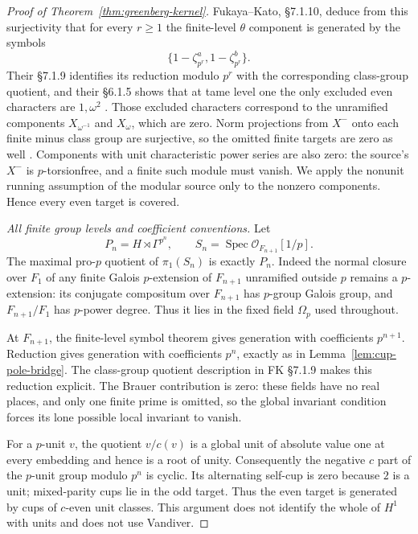 \begin{proof}[Proof of Theorem~\ref{thm:greenberg-kernel}]
Fukaya--Kato, \S7.1.10, deduce from this surjectivity that for every
$r\ge1$ the finite-level $\theta$ component is generated by the
symbols
\[
 \{1-\zeta_{p^r}^{a},1-\zeta_{p^r}^{b}\}.
\]
Their \S7.1.9 identifies its reduction modulo $p^r$ with the
corresponding class-group quotient, and their \S6.1.5 shows that
at tame level one the only excluded even characters are
$1,\omega^2$
\cite[\S6.1.5, p.~76; \S\S7.1.8--7.1.10,
p.~86]{FukayaKato2012}.
Those excluded characters correspond to the unramified components
$X_{\omega^{-1}}$ and $X_\omega$, which are zero. Norm projections
from $X^-$ onto each finite minus class group are surjective, so
the omitted finite targets are zero as well
\cite[Proposition~3.4.1 and proof,
pp.~90--91]{SharifiIwasawaNotes}.
Components with unit characteristic power series are also zero:
the source's $X^-$ is $p$-torsionfree, and a finite such module must
vanish. We apply the nonunit running assumption of the modular
source only to the nonzero components. Hence every even target is
covered.

\emph{All finite group levels and coefficient conventions.}
Let
\[
 P_n=H\rtimes\Gamma^{p^n},\qquad
 S_n=\operatorname{Spec}\mathcal O_{F_{n+1}}[1/p].
\]
The maximal pro-$p$ quotient of $\pi_1(S_n)$ is exactly $P_n$.
Indeed the normal closure over $F_1$ of any finite Galois
$p$-extension of $F_{n+1}$ unramified outside $p$ remains a
$p$-extension: its conjugate compositum over $F_{n+1}$ has
$p$-group Galois group, and $F_{n+1}/F_1$ has $p$-power degree.
Thus it lies in the fixed field $\Omega_p$ used throughout.

At $F_{n+1}$, the finite-level symbol theorem gives generation
with coefficients $p^{n+1}$. Reduction gives generation with
coefficients $p^n$, exactly as in Lemma~\ref{lem:cup-pole-bridge}.
The class-group quotient description in FK \S7.1.9 makes this
reduction explicit. The Brauer contribution is zero: these fields
have no real places, and only one finite prime is omitted, so the
global invariant condition forces its lone possible local
invariant to vanish.

For a $p$-unit $v$, the quotient $v/c(v)$ is a global unit of
absolute value one at every embedding and hence is a root of
unity. Consequently the negative $c$ part of the $p$-unit group
modulo $p^n$ is cyclic. Its alternating self-cup is zero because
$2$ is a unit; mixed-parity cups lie in the odd target. Thus the
even target is generated by cups of $c$-even unit classes. This
argument does not identify the whole of $H^1$ with units and does
not use Vandiver.


\end{proof}
